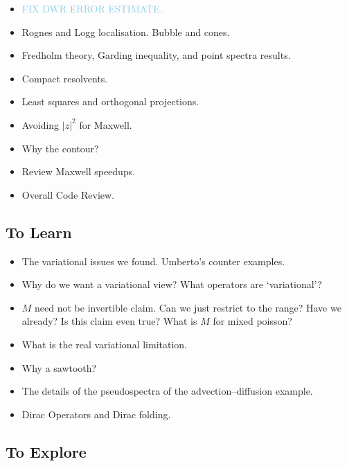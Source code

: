 \documentclass[12pt,a4paper]{article}
\newcommand{\skyblue}[1]{\textcolor{SkyBlue}{#1}}
\begin{document}
\begin{itemize}
    \item \skyblue{FIX DWR ERROR ESTIMATE.}
    \item Rognes and Logg localisation. Bubble and cones. 
    \item Fredholm theory, Garding inequality, and point spectra results. 
    \item Compact resolvents.
    \item Least squares and orthogonal projections.
    \item Avoiding $|z|^2$ for Maxwell. 
    \item Why the contour?
    \item Review Maxwell speedups.
    \item Overall Code Review.
    
\end{itemize}


\subsection{To Learn}

\begin{itemize}
    \item The variational issues we found. Umberto's counter examples. 
        \item Why do we want a variational view? What operators are `variational'?
    \item $M$ need not be invertible claim. Can we just restrict to the range? Have we already? Is this claim even true? What is $M$ for mixed poisson? 
    \item What is the real variational limitation. 
    \item Why a sawtooth?
    \item The details of the pseudospectra of the advection--diffusion example. 
    \item Dirac Operators and Dirac folding.
    
\end{itemize}

\subsection{To Explore}
\end{document}
